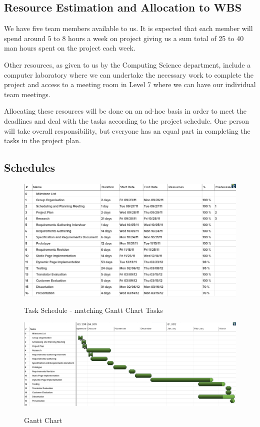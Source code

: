 \documentclass{l3proj}
\begin{document}
\subsection{Resource Estimation and Allocation to WBS}
We have five team members available to us. It is expected that each member will spend around 5 to 8 hours a week on project giving us a sum total of 25 to 40 man hours spent on the project each week.

Other resources, as given to us by the Computing Science department, include a computer laboratory where we can undertake the necessary work to complete the project and access to a meeting room in Level 7 where we can have our individual team meetings.

Allocating these resources will be done on an ad-hoc basis in order to meet the deadlines and deal with the tasks according to the project schedule.
One person will take overall responsibility, but everyone has an equal part in completing the tasks in the project plan.

\subsection{Schedules}

\begin{figure}
\begin{center}
\label{fig:gantttasks}
\includegraphics[scale=0.5, angle=90]{images/tasks}
\caption{\small{Task Schedule - matching Gantt Chart Tasks}}
\end{center}
\end{figure}

\begin{figure}
\begin{center}
\label{fig:ganttchart}
\includegraphics[scale=0.5, angle=90]{gantt}
\caption{\small{Gantt Chart}}
\end{center}
\end{figure}
\end{document}
